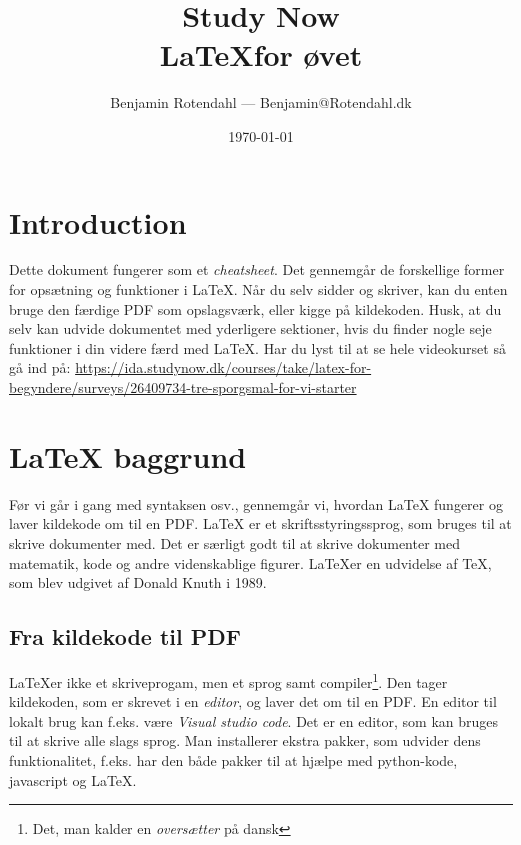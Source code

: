 \documentclass{article}
\title{
  \vspace{13em}
  \large{Study Now} \\
  \Large{\LaTeX for øvet} \\
}
\author{
  Benjamin Rotendahl --- Benjamin@Rotendahl.dk
}
\date{
  \vspace{22em}
  \today
}
\begin{document}
\def\gravApprox{9.82}
\clearpage

\maketitle		%
\thispagestyle{empty}
\newpage

\thispagestyle{empty}\tableofcontents\newpage %

\setcounter{page}{1}

\section{Introduction}
Dette dokument fungerer som et \emph{cheatsheet}. Det gennemgår de forskellige
former for opsætning og funktioner i \LaTeX. Når du selv sidder og skriver, kan
du enten bruge den færdige PDF som opslagsværk, eller kigge på kildekoden.
Husk, at du selv kan udvide dokumentet med yderligere sektioner, hvis du finder
nogle seje funktioner i din videre færd med \LaTeX{}.
Har du lyst til at se hele videokurset så gå ind på:
\url{https://ida.studynow.dk/courses/take/latex-for-begyndere/surveys/26409734-tre-sporgsmal-for-vi-starter}

\section{\LaTeX{} baggrund}
Før vi går i gang med syntaksen osv., gennemgår vi, hvordan \LaTeX{} fungerer og
laver kildekode om til en PDF.
\LaTeX{} er et skriftsstyringssprog, som bruges til at skrive dokumenter med. Det er
særligt godt til at skrive dokumenter med matematik, kode og andre
videnskablige figurer. \LaTeX er en udvidelse af TeX, som blev udgivet af Donald
Knuth i 1989.

\subsection{Fra kildekode til PDF}\label{sec:local}
\LaTeX er ikke et skriveprogam, men et sprog samt compiler\footnote{
	Det, man kalder en \emph{oversætter} på dansk}. Den tager kildekoden, som er skrevet i en
\emph{editor}, og laver det om til en PDF. En editor til lokalt brug kan
f.eks. være \emph{Visual studio code}\cite{vscode}. Det er en editor, som kan
bruges til at skrive alle slags sprog. Man installerer ekstra pakker, som
udvider dens funktionalitet, f.eks. har den både pakker til at hjælpe med
python-kode, javascript og \LaTeX{}\cite{latexPackage}.
\end{document}
